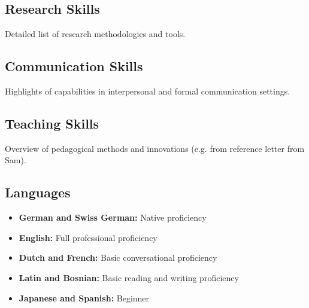 \subsection{Research Skills}
Detailed list of research methodologies and tools.

\subsection{Communication Skills}
Highlights of capabilities in interpersonal and formal communication settings.

\subsection{Teaching Skills}
Overview of pedagogical methods and innovations (e.g. from reference letter from Sam).

\subsection{Languages}
\begin{itemize}
  \item \textbf{German and Swiss German:} Native proficiency
  \item \textbf{English:} Full professional proficiency
  \item \textbf{Dutch and French:} Basic conversational proficiency
  \item \textbf{Latin and Bosnian:} Basic reading and writing proficiency
  \item \textbf{Japanese and Spanish:} Beginner
\end{itemize}